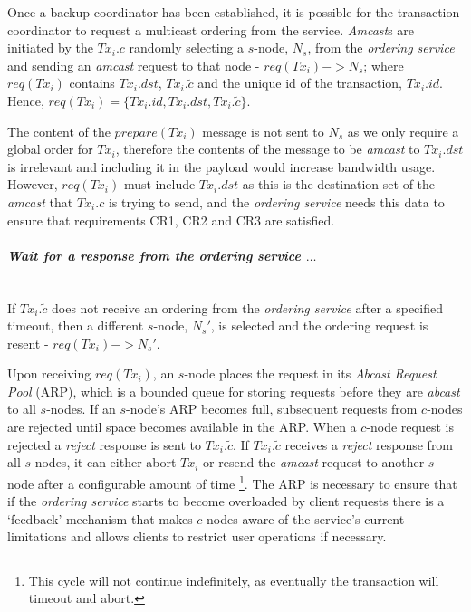 \begin{enumerate}
        \leftbar        
        Once a backup coordinator has been established, it is possible for the transaction coordinator to request a multicast ordering from the service.  \emph{Amcast}s are initiated by the $Tx_i.c$ randomly selecting a $s$-node, $N_s$, from the \emph{ordering service} and sending an \emph{amcast} request to that node - $req(Tx_i) -> N_s$; where $req(Tx_i)$ contains $Tx_i.dst$, $Tx_i.\tilde{c}$ and the unique id of the transaction, $Tx_i.id$.  Hence, $req(Tx_i) = \{Tx_i.id, Tx_i.dst, Tx_i.\tilde{c}\}$.  
        
        The content of the $prepare(Tx_i)$ message is not sent to $N_s$ as we only require a global order for $Tx_i$, therefore the contents of the message to be \emph{amcast} to $Tx_i.dst$ is irrelevant and including it in the payload would increase bandwidth usage.  However, $req(Tx_i)$ must include $Tx_i.dst$ as this is the destination set of the \emph{amcast} that $Tx_i.c$ is trying to send, and the \emph{ordering service} needs this data to ensure that requirements CR1, CR2 and CR3 are satisfied.  
        \endleftbar
        
        \paragraph{\textit{Wait for a response from the ordering service $\ldots$}} \hfill \\
                If $Tx_i.\tilde{c}$ does not receive an ordering from the \emph{ordering service} after a specified timeout, then a different $s$-node, $N_s'$, is selected and the ordering request is resent - $req(Tx_i) -> N_s'$.
        
            Upon receiving $req(Tx_i)$, an $s$-node places the request in its \emph{Abcast Request Pool} (ARP), which is a bounded queue for storing requests before they are \emph{abcast} to all $s$-nodes.  If an $s$-node's ARP becomes full, subsequent requests from $c$-nodes are rejected until space becomes available in the ARP.  When a $c$-node request is rejected a \emph{reject} response is sent to $Tx_i.\tilde{c}$.  If $Tx_i.\tilde{c}$ receives a \emph{reject} response from all $s$-nodes, it can either abort $Tx_i$ or resend the \emph{amcast} request to another $s$-node after a configurable amount of time \footnote{This cycle will not continue indefinitely, as eventually the transaction will timeout and abort.}.  The ARP is necessary to ensure that if the \emph{ordering service} starts to become overloaded by client requests there is a \textquoteleft{}feedback' mechanism that makes $c$-nodes aware of the service's current limitations and allows clients to restrict user operations if necessary. 
            

\end{enumerate}
